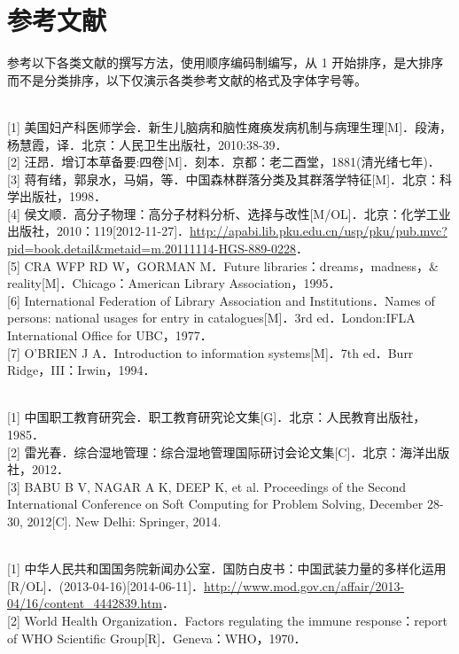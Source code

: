 \documentclass[UTF8,zihao=-4,twoside,openany]{ctexbook}
\begin{document}
\chapter{参考文献}
{\fontsize{10.5pt}{16pt}\selectfont
{\color{red} 参考以下各类文献的撰写方法，使用顺序编码制编写，从 1 开始排序，是大排序而不是分类排序，以下仅演示各类参考文献的格式及字体字号等。}

\vspace{0.4cm}
\\
{[1]} 美国妇产科医师学会．新生儿脑病和脑性瘫痪发病机制与病理生理[M]．段涛，杨慧霞，译．北京：人民卫生出版社，2010:38-39．\\
{[2]} 汪昂．增订本草备要:四卷[M]．刻本．京都：老二酉堂，1881(清光绪七年)．\\
{[3]} 蒋有绪，郭泉水，马娟，等．中国森林群落分类及其群落学特征[M]．北京：科学出版社，1998．\\
{[4]} 侯文顺．高分子物理：高分子材料分析、选择与改性[M/OL]．北京：化学工业出版社，2010：119[2012-11-27]．\url{http://apabi.lib.pku.edu.cn/usp/pku/pub.mvc?pid=book.detail&metaid=m.20111114-HGS-889-0228}．\\
{[5]} CRA WFP RD W，GORMAN M．Future libraries：dreams，madness，\& reality[M]．Chicago：American Library Association，1995．\\
{[6]} International Federation of Library Association and Institutions．Names of persons: national usages for entry in catalogues[M]．3rd ed．London:IFLA International Office for UBC，1977．\\
{[7]} O'BRIEN J A．Introduction to information systems[M]．7th ed．Burr Ridge，III：Irwin，1994．

\vspace{0.4cm}
\\
{[1]} 中国职工教育研究会．职工教育研究论文集[G]．北京：人民教育出版社，1985．\\
{[2]} 雷光春．综合湿地管理：综合湿地管理国际研讨会论文集[C]．北京：海洋出版社，2012．\\
{[3]} BABU B V, NAGAR A K, DEEP K, et al. Proceedings of the Second International Conference on Soft Computing for Problem Solving, December 28-30, 2012[C]. New Delhi: Springer, 2014.

\vspace{0.4cm}
\\
{[1]} 中华人民共和国国务院新闻办公室．国防白皮书：中国武装力量的多样化运用[R/OL]．(2013-04-16)[2014-06-11]．\url{http://www.mod.gov.cn/affair/2013-04/16/content_4442839.htm}．\\
{[2]} World Health Organization．Factors regulating the immune response：report of WHO Scientific Group[R]．Geneva：WHO，1970．

}
\end{document}
